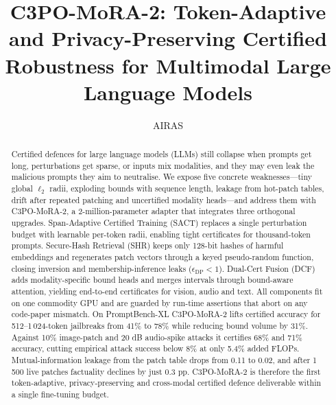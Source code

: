 \documentclass{article}
\title{C3PO-MoRA-2: Token-Adaptive and Privacy-Preserving Certified Robustness for Multimodal Large Language Models}
\author{AIRAS}
\begin{document}
\maketitle

\begin{abstract}
Certified defences for large language models (LLMs) still collapse when prompts get long, perturbations get sparse, or inputs mix modalities, and they may even leak the malicious prompts they aim to neutralise. We expose five concrete weaknesses—tiny global $\ell_2$ radii, exploding bounds with sequence length, leakage from hot-patch tables, drift after repeated patching and uncertified modality heads—and address them with C3PO-MoRA-2, a 2-million-parameter adapter that integrates three orthogonal upgrades. Span-Adaptive Certified Training (SACT) replaces a single perturbation budget with learnable per-token radii, enabling tight certificates for thousand-token prompts. Secure-Hash Retrieval (SHR) keeps only 128-bit hashes of harmful embeddings and regenerates patch vectors through a keyed pseudo-random function, closing inversion and membership-inference leaks ($\epsilon_{\mathrm{DP}}<1$). Dual-Cert Fusion (DCF) adds modality-specific bound heads and merges intervals through bound-aware attention, yielding end-to-end certificates for vision, audio and text. All components fit on one commodity GPU and are guarded by run-time assertions that abort on any code-paper mismatch. On PromptBench-XL C3PO-MoRA-2 lifts certified accuracy for 512–1\,024-token jailbreaks from 41\% to 78\% while reducing bound volume by 31\%. Against 10\% image-patch and 20 dB audio-spike attacks it certifies 68\% and 71\% accuracy, cutting empirical attack success below 8\% at only 5.4\% added FLOPs. Mutual-information leakage from the patch table drops from 0.11 to 0.02, and after 1\,500 live patches factuality declines by just 0.3 pp. C3PO-MoRA-2 is therefore the first token-adaptive, privacy-preserving and cross-modal certified defence deliverable within a single fine-tuning budget.
\end{abstract}
\end{document}
